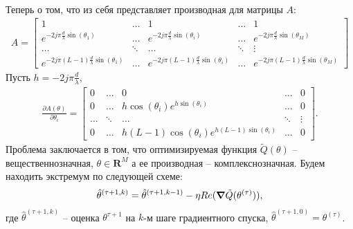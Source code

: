 \documentclass[11pt]{article}
\begin{document}
\\Теперь о том, что из себя представляет производная для матрицы $A$:
\begin{gather*}
A = \begin{bmatrix}
1&\dots&1&\dots&1\\
e^{-2j\pi \frac{d}{\lambda}\sin(\theta_1)}&\dots&e^{-2j\pi \frac{d}{\lambda}\sin(\theta_i)}&\dots&e^{-2j\pi \frac{d}{\lambda}\sin(\theta_M)}\\
\dots&\ddots&\dots&\ddots&\vdots\\
e^{-2j\pi (L-1)\frac{d}{\lambda}\sin(\theta_1)}&\dots&e^{-2j\pi (L-1)\frac{d}{\lambda}\sin(\theta_i)}&\dots&e^{-2j\pi (L-1)\frac{d}{\lambda}\sin(\theta_M)}
\end{bmatrix}
\end{gather*}
Пусть $h=-2j\pi\frac{d}{\lambda}$,
\begin{gather}
\frac{\partial A(\theta)}{\partial \theta_i} = \begin{bmatrix}
0&\dots&0&\dots&0\\
0&\dots&h\cos(\theta_i)e^{h \sin(\theta_i)}&\dots&0\\
\dots&\ddots&\dots&\ddots&\vdots\\
0&\dots&h(L-1)\cos(\theta_i)e^{h(L-1)\sin(\theta_i)}&\dots&0
\end{bmatrix}.
\end{gather}
Проблема заключается в том, что оптимизируемая функция $\tilde{Q}(\theta)$ -- вещественнозначная, $\theta \in \mathbf{R}^M$  а ее производная -- комплекснозначная. Будем находить экстремум по следующей схеме:
\begin{gather}
\hat{\theta}^{(\tau+1, k)}=\hat{\theta}^{(\tau+1, k-1)} - \eta Re(\grad \tilde{Q}(\theta^{(\tau)})),
\end{gather}
где $\hat{\theta}^{(\tau+1, k)}$ -- оценка $\theta^{\tau+1}$ на $k$-м шаге градиентного спуска, $\hat{\theta}^{(\tau+1, 0)} = \theta^{(\tau)}$.
\end{document}
